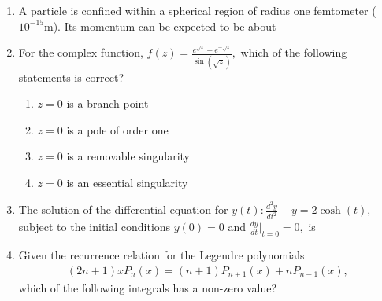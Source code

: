\documentclass[journal,12pt,onecolumn]{IEEEtran}
\theoremstyle{remark}
\begin{document}
\begin{enumerate}
\item A particle is confined within a spherical region of radius one femtometer ($10^{-15}$m). Its momentum can be expected to be about\hfill{}

\begin{enumerate}  \end{enumerate}


\item For the complex function, $f(z)=\frac{e^{\sqrt{z}}-e^{-\sqrt{z}}}{\sin(\sqrt{z})},$ which of the following statements is correct?\hfill{}

\begin{enumerate}
	\item $z=0$ is a branch point \item $z=0$ is a pole of order one
	\item $z=0$ is a removable singularity \item $z=0$ is an essential singularity
\end{enumerate}

\item The solution of the differential equation for $y(t): \frac{d^{2}y}{dt^{2}}-y=2\cosh(t)$, subject to the initial conditions $y(0)=0$ and $\frac{dy}{dt}|_{t=0}=0,$ is\hfill{}

\begin{enumerate}
	\begin{multicols}{2}
	 \item $\frac{1}{2}\cosh(t)+t\sinh(t)$ \item $-\sinh(t)+t\cosh(t)$
	\item $t\cosh(t)$ \item $t\sinh(t)$
	\end{multicols}
\end{enumerate}

\item Given the recurrence relation for the Legendre polynomials
\begin{align*}(2n+1) x P_n(x)=(n+1) P_{n+1}(x)+nP_{n-1}(x),
\end{align*}
which of the following integrals has a non-zero value?\hfill{}


\end{enumerate}
\end{document}
